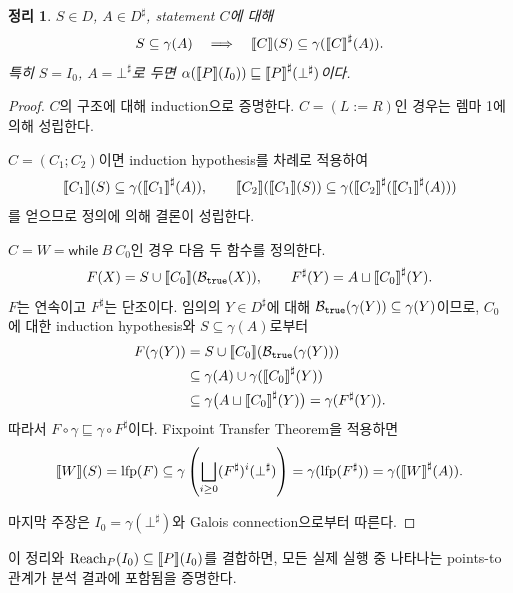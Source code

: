 \documentclass[a4paper, 10pt]{article}
\newtheorem{theorem}{정리}
\begin{document}
\begin{theorem}
$S\in D$, $A\in D^\sharp$, statement $C$에 대해
\[
 S\subseteq\gamma(A)\quad\Longrightarrow\quad
 {\llbracket C \rrbracket}(S)\subseteq\gamma({\llbracket C \rrbracket}^{\sharp}(A)).
\]
특히 $S=I_0$, $A=\bot^\sharp$로 두면
$\alpha({\llbracket P \rrbracket}(I_0))\sqsubseteq{\llbracket P \rrbracket}^{\sharp}(\bot^\sharp)$이다.
\end{theorem}
\begin{proof}
$C$의 구조에 대해 induction으로 증명한다. $C=(L:=R)$인 경우는 렘마 1에 의해 성립한다.

$C = (C_1;C_2)$이면 induction hypothesis를 차례로 적용하여
\[
 {\llbracket C_1 \rrbracket}(S)\subseteq\gamma({\llbracket C_1 \rrbracket}^{\sharp}(A)),\qquad
 {\llbracket C_2 \rrbracket}({\llbracket C_1 \rrbracket}(S))
 \subseteq\gamma({\llbracket C_2 \rrbracket}^{\sharp}({\llbracket C_1 \rrbracket}^{\sharp}(A)))
\]
를 얻으므로 정의에 의해 결론이 성립한다.

$C=W=\mathsf{while}\ B\ C_0$인 경우 다음 두 함수를 정의한다.
\[
 F(X)=S\cup{\llbracket C_0 \rrbracket}(\mathcal B_{\texttt{true}}(X)),\qquad
 F^\sharp(Y)=A\sqcup{\llbracket C_0 \rrbracket}^{\sharp}(Y).
\]
$F$는 연속이고 $F^\sharp$는 단조이다.
임의의 $Y\in D^\sharp$에 대해
$\mathcal B_{\texttt{true}}(\gamma(Y))\subseteq\gamma(Y)$이므로,
$C_0$에 대한 induction hypothesis와 $S\subseteq\gamma(A)$로부터
\[
\begin{aligned}
 F(\gamma(Y))
 &=S\cup{\llbracket C_0 \rrbracket}(\mathcal B_{\texttt{true}}(\gamma(Y)))\\
 &\subseteq\gamma(A)\cup\gamma({\llbracket C_0 \rrbracket}^{\sharp}(Y))\\
 &\subseteq\gamma\bigl(A\sqcup{\llbracket C_0 \rrbracket}^{\sharp}(Y)\bigr)
 =\gamma(F^\sharp(Y)).
\end{aligned}
\]
따라서 $F\circ\gamma\sqsubseteq\gamma\circ F^\sharp$이다.
Fixpoint Transfer Theorem을 적용하면
\[
 {\llbracket W \rrbracket}(S)=\operatorname{lfp}(F)
 \subseteq\gamma\left(\bigsqcup_{i\ge0}(F^\sharp)^i(\bot^\sharp)\right)
 =\gamma(\operatorname{lfp}(F^\sharp))
 =\gamma({\llbracket W \rrbracket}^{\sharp}(A)).
\]

마지막 주장은 $I_0=\gamma(\bot^\sharp)$와 Galois connection으로부터 따른다.
\end{proof}
이 정리와 $\mathrm{Reach}_P(I_0)\subseteq{\llbracket P \rrbracket}(I_0)$를 결합하면,
모든 실제 실행 중 나타나는 points-to 관계가 분석 결과에 포함됨을 증명한다.
\end{document}
